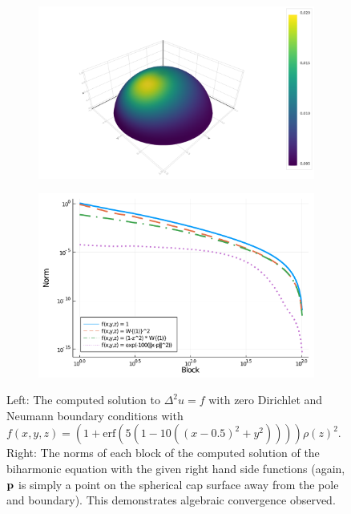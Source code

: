 \documentclass[11pt, oneside]{article}   	%
\begin{document}
\begin{figure}[t]
	\begin{subfigure}{0.5\textwidth}
	\includegraphics[scale=0.25]{biharmonic-f=erf-N=80-n=50}
	\centering
	\end{subfigure}
	\begin{subfigure}{0.5\textwidth}
	\includegraphics[scale=0.3]{solutionblocknorms-biharmonic-N=100}
	\centering
	\end{subfigure}
	\caption{Left: The computed solution to $\Delta^2 u = f$ with zero Dirichlet and Neumann boundary conditions with $f(x,y,z) = (1 + \text{erf}(5(1 - 10((x - 0.5)^2 + y^2)))) \rho(z)^2$. Right: The norms of each block of the computed solution of the biharmonic equation with the given right hand side functions (again, $\bf{p}$ is simply a point on the spherical cap surface away from the pole and boundary). This demonstrates algebraic convergence observed.}
	\centering
	\label{fig:biharmonic}
\end{figure}
\end{document}
